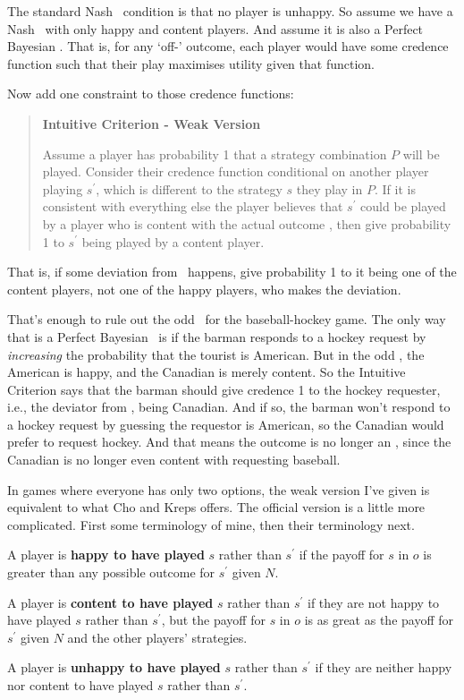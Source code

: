 \noindent The standard Nash \eqm\ condition is that no player is unhappy. So assume we have a Nash \eqm\, with only happy and content players. And assume it is also a Perfect Bayesian \eqm. That is, for any `off-\eqm' outcome, each player would have some credence function such that their play maximises utility given that function.

Now add one constraint to those credence functions:

\begin{quote}
\textbf{Intuitive Criterion - Weak Version}

Assume a player has probability 1 that a strategy combination $P$ will be played. Consider their credence function conditional on another player playing $s^\prime$, wh\-ich is different to the strategy $s$ they play in $P$. If it is consistent with everything else the player believes that $s^\prime$ could be played by a player who is content with the actual outcome , then give probability 1 to $s^\prime$ being played by a content player.
\end{quote}

\noindent That is, if some deviation from \eqm\ happens, give probability 1 to it being one of the content players, not one of the happy players, who makes the deviation.

That's enough to rule out the odd \eqm\ for the baseball-hockey game. The only way that is a Perfect Bayesian \eqm\ is if the barman responds to a hockey request by \textit{increasing} the probability that the tourist is American. But in the odd \eqm, the American is happy, and the Canadian is merely content. So the Intuitive Criterion says that the barman should give credence 1 to the hockey requester, i.e., the deviator from \eqm, being Canadian. And if so, the barman won't respond to a hockey request by guessing the requestor is American, so the Canadian would prefer to request hockey. And that means the outcome is no longer an \eqm, since the Canadian is no longer even content with requesting baseball.

In games where everyone has only two options, the weak version I've given is equivalent to what Cho and Kreps offers. The official version is a little more complicated. First some terminology of mine, then their terminology next.

\begin{itemize*}
\item A player is \textbf{happy to have played} $s$ rather than $s^\prime$ if the payoff for $s$ in $o$ is greater than any possible outcome for $s^\prime$ given $N$.
\item A player is \textbf{content to have played} $s$ rather than $s^\prime$ if they are not happy to have played $s$ rather than $s^\prime$, but the payoff for $s$ in $o$ is as great as the payoff for $s^\prime$ given $N$ and the other players' strategies.
\item A player is \textbf{unhappy to have played} $s$ rather than $s^\prime$ if they are neither happy nor content to have played $s$ rather than $s^\prime$.
\end{itemize*}


